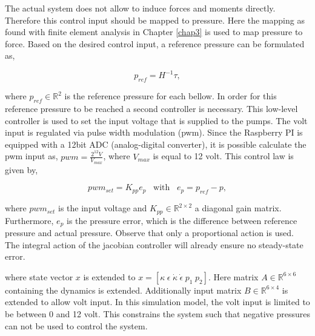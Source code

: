 The actual system does not allow to induce forces and moments directly. Therefore this control input should be mapped to pressure. Here the mapping as found with finite element analysis in Chapter \ref{chap3} is used to map pressure to force. Based on the desired control input, a reference pressure can be formulated as,

\begin{equation}
    p_{ref} = H^{-1}\tau,
\end{equation}


where $p_{ref} \in \mathbb{R}^2$ is the reference pressure for each bellow. In order for this reference pressure to be reached a second controller is necessary. This low-level controller is used to set the input voltage that is supplied to the pumps.  The volt input is regulated via pulse width modulation (pwm). Since the Raspberry PI is equipped with a 12bit ADC (analog-digital converter), it is possible calculate the pwm input as, $\textit{pwm} = \frac{2^{12} V}{V_{max}} $, where $V_{max}$ is equal to 12 volt. This control law is given by,


\begin{equation}
    pwm_{set} = K_{pp}e_p \hspace{10pt} \text{with} \hspace{10pt} e_p = p_{ref} - p,
\end{equation}



where $pwm_{set}$ is the input voltage and $K_{pp} \in \mathbb{R}^{2\times 2}$ a diagonal gain matrix. Furthermore, $e_p$ is the pressure error, which is the difference between reference pressure and actual pressure. Observe that only a proportional action is used. The integral action of the jacobian controller will already ensure no steady-state error. 




where state vector $x$ is extended to $x = [\kappa \hspace{3pt} \epsilon \hspace{3pt} \dot{\kappa} \hspace{3pt} \dot{\epsilon} \hspace{3pt} p_1 \hspace{3pt} p_2]$. Here matrix $A \in \mathbb{R}^{6\times 6}$ containing the dynamics is extended. Additionally input matrix $B \in \mathbb{R}^{6\times 4}$ is extended to allow volt input. In this simulation model, the volt input is limited to be between 0 and 12 volt. This constrains the system such that negative pressures can not be used to control the system. 

